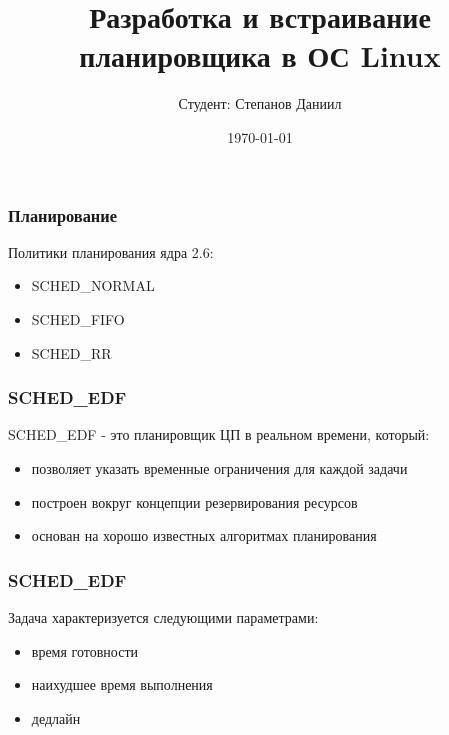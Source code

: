 \documentclass[10pt]{beamer}
\begin{document}
\title[Scheduler]{Разработка и встраивание планировщика в ОС Linux}
\author[Степанов Даниил]{Студент: Степанов Даниил}
\date{\today} 


\begin{frame}
\titlepage
\end{frame}



\begin{frame}\frametitle{Планирование}
Политики планирования ядра 2.6:
\begin{itemize}
\item SCHED\_NORMAL
\item SCHED\_FIFO 
\item SCHED\_RR 
\end{itemize}
\end{frame}

\begin{frame}\frametitle{SCHED\_EDF}
SCHED\_EDF - это планировщик ЦП в реальном времени, который:
\begin{itemize}
\item позволяет указать временные ограничения для каждой задачи
\item построен вокруг концепции резервирования ресурсов
\item основан на хорошо известных алгоритмах планирования 
\end{itemize}
\end{frame}

\begin{frame}\frametitle{SCHED\_EDF}
Задача характеризуется следующими параметрами:
\begin{itemize}
\item время готовности
\item наихудшее время выполнения
\item дедлайн 
\end{itemize}
\end{frame}
\end{document}
